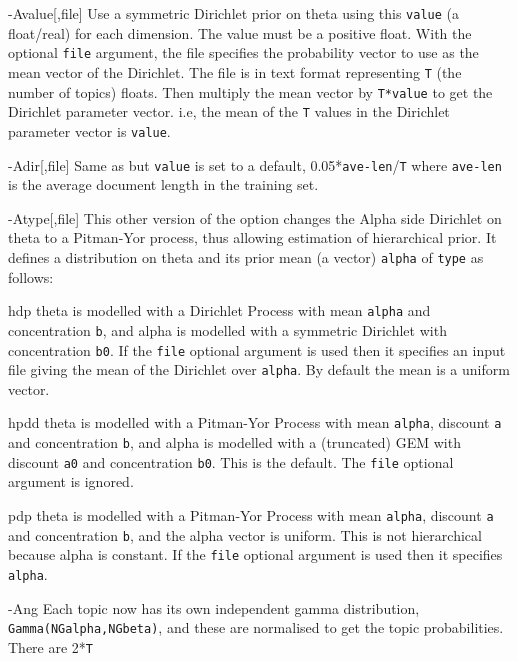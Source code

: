 \documentclass[a4paper,english]{article}
\begin{document}
\begin{Description}\setlength{\itemsep}{0cm}
\item[{-A}{value[,file]}]  Use a symmetric Dirichlet prior on theta
using this \texttt{value} (a float/real) for each dimension.  The value must be a positive float.  With the optional \texttt{file} argument, the file
specifies the probability vector to use as the mean vector of the
Dirichlet. The file is in text format representing  \texttt{T} 
(the number of topics) floats.
Then multiply the mean vector by \texttt{T*value} 
to get the Dirichlet parameter vector.
i.e, the mean of the \texttt{T} values 
in the Dirichlet parameter vector is \texttt{value}.
\item[{-A}{dir[,file]}]  Same as  but
\texttt{value} is set to a default,
0.05*\texttt{ave-len}/\texttt{T} where
\texttt{ave-len} is the average document length in the training set.
\item[{-A}{type[,file]}]  This other version of the
 option  changes the Alpha side 
Dirichlet on theta to a Pitman-Yor process, thus
allowing estimation of hierarchical prior.
It defines a distribution on theta and its prior mean (a vector) 
 \texttt{alpha} of \texttt{type} as follows:
\begin{Description}[hpdd]
\item[hdp] 
theta is modelled with a Dirichlet Process 
with mean \texttt{alpha} and concentration \texttt{b},
and alpha is modelled with a symmetric Dirichlet with concentration
\texttt{b0}.
If the \texttt{file} optional argument is used
then it specifies an input file giving the
mean of the Dirichlet over \texttt{alpha}.
By default the mean is a uniform vector.
\item[hpdd] theta is modelled with a Pitman-Yor Process
with mean \texttt{alpha}, discount \texttt{a} and concentration \texttt{b},
and alpha is modelled with a (truncated) GEM 
with discount \texttt{a0} and concentration \texttt{b0}.
This is the default.
The \texttt{file} optional argument is ignored.
\item[pdp] theta is modelled with a Pitman-Yor Process
with mean \texttt{alpha}, discount \texttt{a} and concentration \texttt{b},
and the alpha vector is uniform.
This is not hierarchical because alpha is constant.
If the \texttt{file} optional argument is used
then it specifies \texttt{alpha}.
\item[{-A}{ng}]  Each topic now has its own independent gamma distribution,
\texttt{Gamma(NGalpha,NGbeta)},
and these are normalised to get the topic probabilities.  There are 2*\texttt{T}

\end{Description}
\end{Description}
\end{document}
